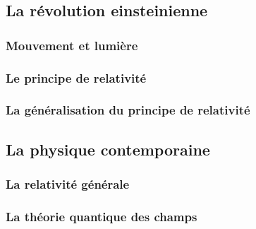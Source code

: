 \subsection{La révolution einsteinienne}
    \subsubsection{Mouvement et lumière}
    \subsubsection{Le principe de relativité}
    \subsubsection{La généralisation du principe de relativité}

\subsection{La physique contemporaine}
  \subsubsection{La relativité générale}
  \subsubsection{La théorie quantique des champs}




